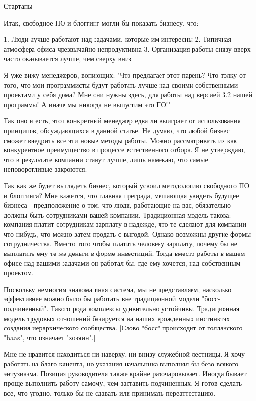\documentclass[ebook,12pt,oneside,openany]{memoir}
\begin{document}
Стартапы

Итак, свободное ПО и блоггинг могли бы показать бизнесу, что:

1. Люди лучше работают над задачами, которые им интересны 2. Типичная
атмосфера офиса чрезвычайно непродуктивна 3. Организация работы снизу
вверх часто оказывается лучше, чем сверху вниз

Я уже вижу менеджеров, вопиющих: "Что предлагает этот парень? Что
толку от того, что мои программисты будут работать лучше над своими
собственными проектами у себя дома? Мне они нужны здесь, для работы
над версией 3.2 нашей программы! А иначе мы никогда не выпустим это
ПО!"

Так оно и есть, этот конкретный менеджер едва ли выиграет от
использования принципов, обсуждающихся в данной статье. Не думаю, что
любой бизнес сможет внедрить все эти новые методы работы. Можно
рассматривать их как конкурентное преимущество в процессе
естественного отбора. Я не утверждаю, что в результате компании станут
лучше, лишь намекаю, что самые неповоротливые закроются.

Так как же будет выглядеть бизнес, который усвоил методологию
свободного ПО и блоггинга? Мне кажется, что главная преграда, мешающая
увидеть будущее бизнеса - предположение о том, что люди, работающие на
вас, обязательно должны быть сотрудниками вашей компании. Традиционная
модель такова: компания платит сотрудникам зарплату в надежде, что те
сделают для компании что-нибудь, что можно затем продать с выгодой.
Однако возможны другие формы сотрудничества. Вместо того чтобы платить
человеку зарплату, почему бы не выплатить ему те же деньги в форме
инвестиций. Тогда вместо работы в вашем офисе над вашими задачами он
работал бы, где ему хочется, над собственным проектом.

Поскольку немногим знакома иная система, мы не представляем, насколько
эффективнее можно было бы работать вне традиционной модели
"босс-подчиненный". Такого рода комплексы удивительно устойчивы.
Традиционная модель трудовых отношений базируется на наших врожденных
инстинктах создания иерархического сообщества. [Слово "босс"
происходит от голланского "baas", что означает "хозяин".]

Мне не нравится находиться ни наверху, ни внизу служебной лестницы. Я
хочу работать на благо клиента, но указания начальника выполнял бы
безо всякого энтузиазма. Позиция руководителя также крайне
разочаровывает. Иногда бывает проще выполнить работу самому, чем
заставить подчиненных. Я готов сделать все, что угодно, только бы не
сдавать или принимать переаттестацию.
\end{document}
